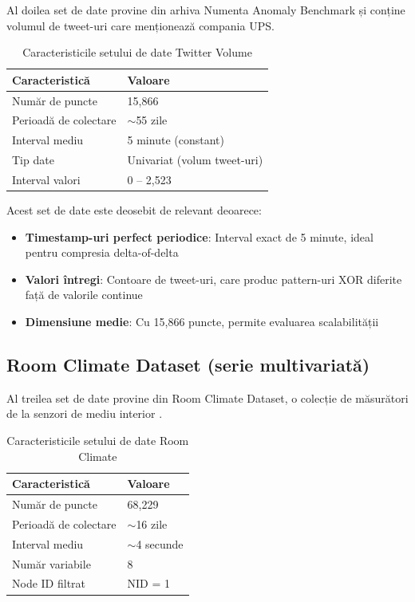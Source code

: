 Al doilea set de date provine din arhiva Numenta Anomaly Benchmark și conține volumul de tweet-uri care menționează compania UPS.

\begin{table}[h]
\centering
\begin{tabular}{@{}ll@{}}
\toprule
\textbf{Caracteristică} & \textbf{Valoare} \\
\midrule
Număr de puncte & 15,866 \\
Perioadă de colectare & $\sim$55 zile \\
Interval mediu & 5 minute (constant) \\
Tip date & Univariat (volum tweet-uri) \\
Interval valori & 0 -- 2,523 \\
\bottomrule
\end{tabular}
\caption{Caracteristicile setului de date Twitter Volume}
\label{tab:twitter-dataset}
\end{table}

Acest set de date este deosebit de relevant deoarece:
\begin{itemize}
    \item \textbf{Timestamp-uri perfect periodice}: Interval exact de 5 minute, ideal pentru compresia delta-of-delta
    \item \textbf{Valori întregi}: Contoare de tweet-uri, care produc pattern-uri XOR diferite față de valorile continue
    \item \textbf{Dimensiune medie}: Cu 15,866 puncte, permite evaluarea scalabilității
\end{itemize}

\subsection{Room Climate Dataset (serie multivariată)}

Al treilea set de date provine din Room Climate Dataset, o colecție de măsurători de la senzori de mediu interior \cite{roomclimate}.

\begin{table}[h]
\centering
\begin{tabular}{@{}ll@{}}
\toprule
\textbf{Caracteristică} & \textbf{Valoare} \\
\midrule
Număr de puncte & 68,229 \\
Perioadă de colectare & $\sim$16 zile \\
Interval mediu & $\sim$4 secunde \\
Număr variabile & 8 \\
Node ID filtrat & NID = 1 \\
\bottomrule
\end{tabular}
\caption{Caracteristicile setului de date Room Climate}
\label{tab:room-dataset}
\end{table}

